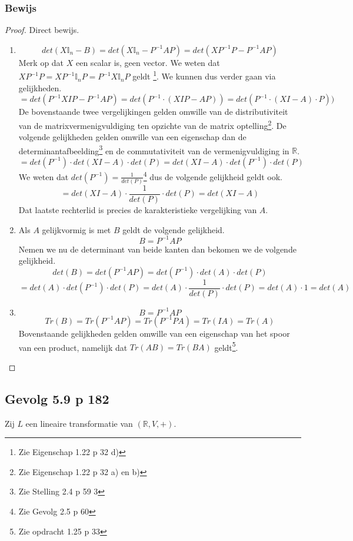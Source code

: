 \documentclass[lineaire_algebra_oplossingen.tex]{subfiles}
\begin{document}
\subsubsection*{Bewijs}
\begin{proof}
Direct bewijs.
\begin{enumerate}
\item 
\[
det(X\mathbb{I}_n - B) = det(X\mathbb{I}_n - P^{-1}AP) = det(XP^{-1}P - P^{-1}AP)
\]
Merk op dat $X$ een scalar is, geen vector.
We weten dat $XP^{-1}P = XP^{-1}\mathbb{I}_nP=P^{-1}X\mathbb{I}_nP$ geldt \footnote{Zie Eigenschap 1.22 p 32 d)}. We kunnen dus verder gaan via gelijkheden.
\[
= det(P^{-1} XI P - P^{-1}AP) = det(P^{-1}\cdot ( XI P - AP)) = det(P^{-1}\cdot ( XI- A) \cdot P))
\]
De bovenstaande twee vergelijkingen gelden omwille van de distributiviteit van de matrixvermenigvuldiging ten opzichte van de matrix optelling\footnote{Zie Eigenschap 1.22 p 32 a) en b)}. De volgende gelijkheden gelden omwille van een eigenschap dan de determinantafbeelding\footnote{Zie Stelling 2.4 p 59 3} en de commutativiteit van de vermenigvuldiging in $\mathbb{R}$.
\[
=det(P^{-1})\cdot det( XI- A)\cdot det(P) =det( XI- A)\cdot det(P^{-1}) \cdot det(P)
\]
We weten dat $det( P^{-1}) = \frac{1}{det(P)}$\footnote{Zie Gevolg 2.5 p 60} dus de volgende gelijkheid geldt ook.
\[
=det( XI- A)\cdot \frac{1}{det(P)}\cdot det(P) = det( XI- A)
\]
Dat laatste rechterlid is precies de karakteristieke vergelijking van $A$.

\item
Als $A$ gelijkvormig is met $B$ geldt de volgende gelijkheid.
\[
B = P^{-1}AP
\]
Nemen we nu de determinant van beide kanten dan bekomen we de volgende gelijkheid.
\[
det(B) = det(P^{-1}AP) = det(P^{-1})\cdot det(A)\cdot det(P)
\]
\[
= det(A)\cdot det(P^{-1})\cdot det(P) = det(A)\cdot \frac{1}{det(P)}\cdot det(P) = det(A) \cdot 1 = det(A)
\]

\item
\[
B = P^{-1}AP 
\]
\[
Tr(B) = Tr(P^{-1}A P) = Tr(P^{-1}P A) = Tr(IA) = Tr(A)
\]
Bovenstaande gelijkheden gelden omwille van een eigenschap van het spoor van een product, namelijk dat $Tr(AB) = Tr(BA)$ geldt\footnote{Zie opdracht 1.25 p 33}.
\end{enumerate}
\end{proof}

\subsection{Gevolg 5.9 p 182}
Zij $L$ een lineaire transformatie van $(\mathbb{R},V,+)$.
\end{document}
